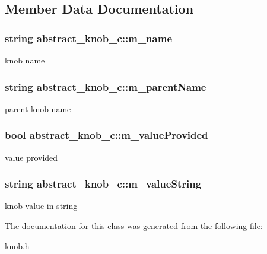 \subsection{Member Data Documentation}
\hypertarget{classabstract__knob__c_a706239ddb3144e45278c2285e129ba84}{
\subsubsection[{m\_\-name}]{\setlength{\rightskip}{0pt plus 5cm}string {\bf abstract\_\-knob\_\-c::m\_\-name}}}
\label{classabstract__knob__c_a706239ddb3144e45278c2285e129ba84}
knob name \hypertarget{classabstract__knob__c_a35408499c80112fa114354a1fc2e892d}{
\subsubsection[{m\_\-parentName}]{\setlength{\rightskip}{0pt plus 5cm}string {\bf abstract\_\-knob\_\-c::m\_\-parentName}}}
\label{classabstract__knob__c_a35408499c80112fa114354a1fc2e892d}
parent knob name \hypertarget{classabstract__knob__c_a80ab5654d985a3f6b0c452575975e257}{
\subsubsection[{m\_\-valueProvided}]{\setlength{\rightskip}{0pt plus 5cm}bool {\bf abstract\_\-knob\_\-c::m\_\-valueProvided}}}
\label{classabstract__knob__c_a80ab5654d985a3f6b0c452575975e257}
value provided \hypertarget{classabstract__knob__c_a9a877666f9147d4f7cce24a410fb04a2}{
\subsubsection[{m\_\-valueString}]{\setlength{\rightskip}{0pt plus 5cm}string {\bf abstract\_\-knob\_\-c::m\_\-valueString}}}
\label{classabstract__knob__c_a9a877666f9147d4f7cce24a410fb04a2}
knob value in string 

The documentation for this class was generated from the following file:\begin{DoxyCompactItemize}
\item 
knob.h\end{DoxyCompactItemize}
